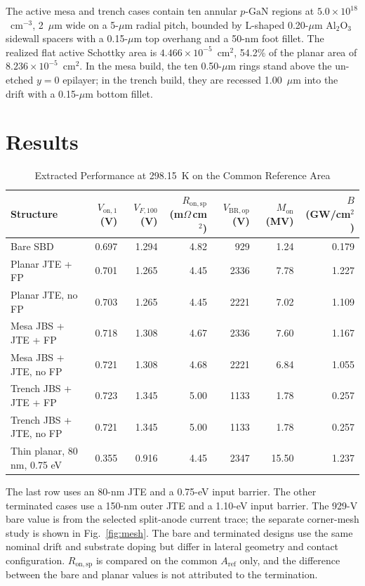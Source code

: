 \documentclass[journal,10pt]{IEEEtran}
\newcommand{\pGaN}{\ensuremath{p\text{-}\mathrm{GaN}}}
\newcommand{\Vop}{\ensuremath{V_{\mathrm{BR,op}}}}
\newcommand{\Von}{\ensuremath{V_{\mathrm{on},1}}}
\newcommand{\Ron}{\ensuremath{R_{\mathrm{on,sp}}}}
\begin{document}
The active mesa and trench cases contain ten annular \pGaN{} regions at $5.0\times10^{18}$~cm$^{-3}$, 2~$\mu$m wide on a 5-$\mu$m radial pitch, bounded by L-shaped 0.20-$\mu$m Al$_2$O$_3$ sidewall spacers with a 0.15-$\mu$m top overhang and a 50-nm foot fillet. The realized flat active Schottky area is $4.466\times10^{-5}$~cm$^2$, 54.2\% of the planar area of $8.236\times10^{-5}$~cm$^2$. In the mesa build, the ten 0.50-$\mu$m rings stand above the un-etched $y=0$ epilayer; in the trench build, they are recessed 1.00~$\mu$m into the drift with a 0.15-$\mu$m bottom fillet.

\section{Results}
\begin{table}[!t]
\caption{Extracted Performance at 298.15~K on the Common Reference Area}
\label{tab:architectures}
\centering\footnotesize
\begin{tabular}{lrrrrrr}
\toprule
Structure & $\Von$ (V) & $V_{F,100}$ (V) & $\Ron$ (m$\Omega$\,cm$^2$) & $\Vop$ (V) & $M_{\mathrm{on}}$ (MV) & $B$ (GW/cm$^2$)\\
\midrule
Bare SBD & 0.697 & 1.294 & 4.82 & 929 & 1.24 & 0.179\\
Planar JTE + FP & 0.701 & 1.265 & 4.45 & 2336 & 7.78 & 1.227\\
Planar JTE, no FP & 0.703 & 1.265 & 4.45 & 2221 & 7.02 & 1.109\\
Mesa JBS + JTE + FP & 0.718 & 1.308 & 4.67 & 2336 & 7.60 & 1.167\\
Mesa JBS + JTE, no FP & 0.721 & 1.308 & 4.68 & 2221 & 6.84 & 1.055\\
Trench JBS + JTE + FP & 0.723 & 1.345 & 5.00 & 1133 & 1.78 & 0.257\\
Trench JBS + JTE, no FP & 0.721 & 1.345 & 5.00 & 1133 & 1.78 & 0.257\\
Thin planar, 80 nm, 0.75 eV & 0.355 & 0.916 & 4.45 & 2347 & 15.50 & 1.237\\
\bottomrule
\end{tabular}
\par\smallskip\begin{minipage}{0.96\textwidth}\footnotesize
The last row uses an 80-nm JTE and a 0.75-eV input barrier. The other terminated cases use a 150-nm outer JTE and a 1.10-eV input barrier. The 929-V bare value is from the selected split-anode current trace; the separate corner-mesh study is shown in Fig.~\ref{fig:mesh}. The bare and terminated designs use the same nominal drift and substrate doping but differ in lateral geometry and contact configuration. $R_{\mathrm{on,sp}}$ is compared on the common $A_{\mathrm{ref}}$ only, and the difference between the bare and planar values is not attributed to the termination.
\end{minipage}
\end{table}
\end{document}
